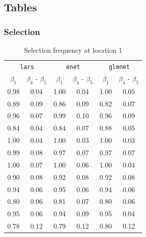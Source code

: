 \documentclass[authoryear, review, 11pt]{elsarticle}
\begin{document}
	
	\subsection{Tables}
		\subsubsection{Selection}
		\begin{table}[ht]
		\begin{center}
		\begin{tabular}{cc|cc|cc}
		\multicolumn{2}{c}{\texttt{lars}} & \multicolumn{2}{c}{\texttt{enet}} & \multicolumn{2}{c}{\texttt{glmnet}} \\
		 $\beta_1$ & $\beta_4$ - $\beta_5$ & $\beta_1$ & $\beta_4$ - $\beta_5$ & $\beta_1$ & $\beta_4$ - $\beta_5$ \\ 
		  \hline
		0.98 & 0.04 & 1.00 & 0.04 & 1.00 & 0.05 \\ 
		  0.89 & 0.09 & 0.86 & 0.09 & 0.82 & 0.07 \\ 
		  0.96 & 0.07 & 0.99 & 0.10 & 0.96 & 0.09 \\ 
		  0.84 & 0.04 & 0.84 & 0.07 & 0.88 & 0.05 \\ 
		  \hline
		  1.00 & 0.04 & 1.00 & 0.03 & 1.00 & 0.03 \\ 
		  0.99 & 0.08 & 0.97 & 0.07 & 0.97 & 0.07 \\ 
		  1.00 & 0.07 & 1.00 & 0.06 & 1.00 & 0.04 \\ 
		  0.90 & 0.08 & 0.92 & 0.08 & 0.92 & 0.08 \\ 
		  \hline
		  0.94 & 0.06 & 0.95 & 0.06 & 0.94 & 0.06 \\ 
		  0.80 & 0.06 & 0.81 & 0.07 & 0.80 & 0.06 \\ 
		  0.95 & 0.06 & 0.94 & 0.09 & 0.95 & 0.04 \\ 
		  0.78 & 0.12 & 0.79 & 0.12 & 0.80 & 0.12 \\ 
		  \end{tabular}
		\caption{Selection frequency at location 1\label{table:loc1-selection}}
		\end{center}
		\end{table}
\end{document}
